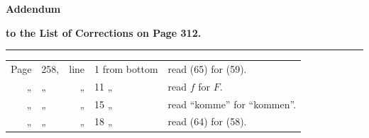 \documentclass[11pt,a4paper,leqno]{article}
\begin{document}
\begin{center}
{\Large\bfseries Addendum}

{\large\bfseries to the List of Corrections on Page 312.}

\rule{1.8cm}{0.4pt}
\end{center}

\begin{tabular}{@{}r@{\ }l@{\ }r@{\ }l@{\ }l@{}}
Page & 258, & line & 1 from bottom & read (65) for (59).\\
„    & „    & „    & 11 „           & read $f$ for $F$.\\
„    & „    & „    & 15 „           & read “komme” for “kommen”.\\
„    & „    & „    & 18 „           & read (64) for (58).\\
\end{tabular}
\end{document}
